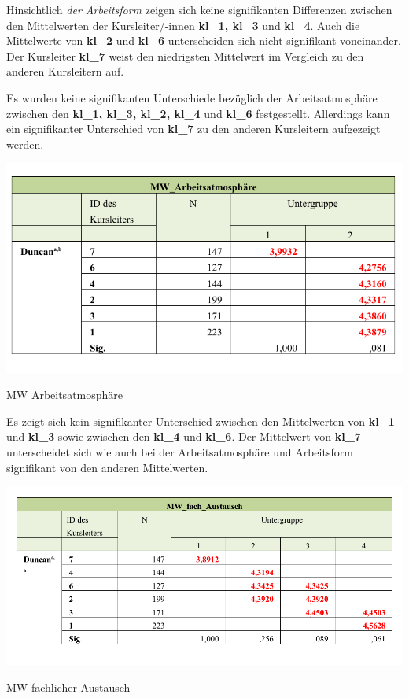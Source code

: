 \documentclass[12pt,a4paper]{article}
\begin{document}
Hinsichtlich \textit{der Arbeitsform} zeigen sich keine signifikanten Differenzen zwischen den Mittelwerten der Kursleiter/-innen \textbf{kl\_1, kl\_3} und \textbf{kl\_4}. Auch die Mittelwerte von \textbf{kl\_2} und \textbf{kl\_6} unterscheiden sich nicht signifikant von\-ei\-nan\-der. Der Kursleiter \textbf{kl\_7} weist den niedrigsten Mittelwert im Vergleich zu den anderen Kursleitern auf. 

Es wurden keine signifikanten Unterschiede bezüglich der Arbeitsatmosphäre zwischen den \textbf{kl\_1, kl\_3, kl\_2, kl\_4} und \textbf{kl\_6} festgestellt. Allerdings kann ein signifikanter Unterschied von \textbf{kl\_7} zu den anderen Kursleitern aufgezeigt werden. 


\begin{table}[!ht]
\includegraphics[scale=1.0]{tab02.pdf}
\caption{MW Arbeitsatmosphäre}
\label{tab.7}
\end{table}
\FloatBarrier


Es zeigt sich kein signifikanter Unterschied zwischen den Mittelwerten von \textbf{kl\_1} und \textbf{kl\_3} sowie zwischen den \textbf{kl\_4} und \textbf{kl\_6}. Der Mittelwert von \textbf{kl\_7} unterscheidet sich wie auch bei der Arbeitsatmosphäre und Arbeitsform signifikant von den anderen Mittelwerten.

\begin{table}[!ht]
\includegraphics[scale=0.82]{tab03.pdf}
\caption{MW fachlicher Austausch}
\label{tab.8}
\end{table}
\FloatBarrier
\end{document}
